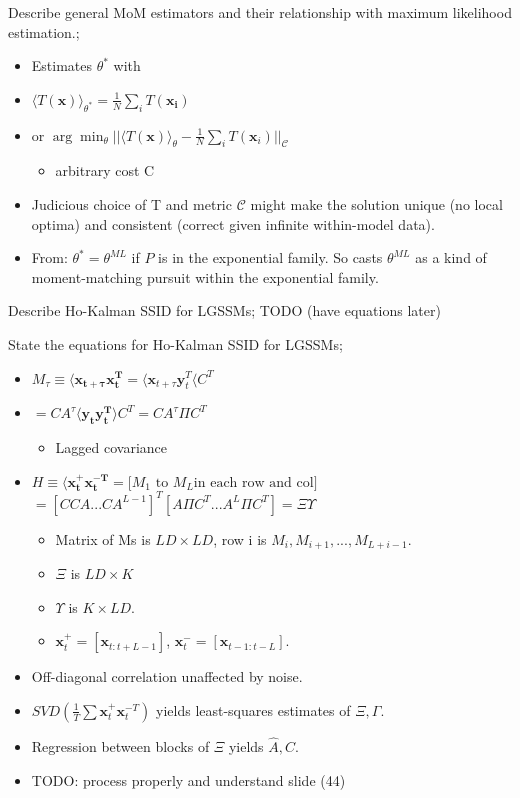 \documentclass{article}
\begin{document}

Describe general MoM estimators and their relationship with maximum likelihood estimation.; \begin{itemize} \item Estimates $\theta^*$ with \item $\langle T(\mathbf{x}) \rangle_{\theta^*} = \frac{1}{N}\sum_i T(\mathbf{x_i})$ \item or $\arg\min_\theta ||\langle T(\mathbf{x})\rangle_\theta - \frac{1}{N}\sum_i T(\mathbf{x}_i)||_\mathcal{C}$ \begin{itemize} \item arbitrary cost C \end{itemize} \item Judicious choice of T and metric $\mathcal{C}$ might make the solution unique (no local optima) and consistent (correct given infinite within-model data). \item From: $\theta^*=\theta^{ML}$ if $P$ is in the exponential family. So casts $\theta^{ML}$ as a kind of moment-matching pursuit within the exponential family. \end{itemize}

Describe Ho-Kalman SSID for LGSSMs; TODO (have equations later)

State the equations for Ho-Kalman SSID for LGSSMs; \begin{itemize} \item $M_\tau \equiv \langle \mathbf{x_{t+\tau}x^T_t}=\langle \mathbf{x}_{t+\tau}\mathbf{y}^T_t \langle C^T$ \item $=CA^\tau \langle \mathbf{y_ty_t^T}\rangle C^T=CA^\tau \Pi C^T$ \begin{itemize} \item Lagged covariance \end{itemize} \item $H\equiv \langle \mathbf{x_t^+ x_t^{-T}}=\big [ M_1\text{ to }M_L\text{in each row and col} \big]$ $= [C CA ... CA^{L-1}]^T [A\Pi C^T...A^L\Pi C^T] = \Xi\Upsilon$ \begin{itemize} \item Matrix of Ms is $LD\times LD$, row i is $M_i, M_{i+1},...,M_{L+i-1}$. \item $\Xi$ is $LD\times K$ \item $\Upsilon$ is $K\times LD$. \item $\mathbf{x}^+_t = [\mathbf{x}_{t:t+L-1}]$, $\mathbf{x}_t^- = [\mathbf{x}_{t-1:t-L}]$. \end{itemize} \item Off-diagonal correlation unaffected by noise. \item $SVD(\frac{1}{T}\sum\mathbf{x}_t^+\mathbf{x}_t^{-T})$ yields least-squares estimates of $\Xi, \Gamma$. \item Regression between blocks of $\Xi$ yields $\hat{A}, \hat{C}$. \item TODO: process properly and understand slide (44) \end{itemize}
\end{document}

